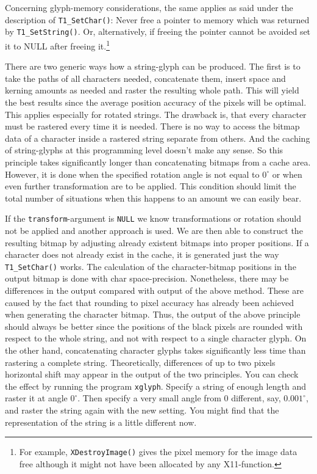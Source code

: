 Concerning glyph-memory considerations, the same applies as said under
the description of \verb+T1_SetChar()+: Never free a pointer to memory
which was returned by \verb+T1_SetString()+. Or, alternatively, if freeing
the pointer cannot be avoided set it to NULL after freeing it.\footnote{For
  example, {\tt XDestroyImage()} gives the pixel memory for the image
  data free although it might not have been allocated by any X11-function.} 

There are two generic ways how a string-glyph can be produced. The first is to
take the paths of all characters needed, concatenate them, insert space and
kerning amounts as needed and raster the resulting whole path. This will yield
the best results since the average position accuracy of the pixels will be
optimal. This applies especially for rotated strings. The drawback is, that
every character must be rastered every time it is needed. There is no way to
access the bitmap data of a character inside a rastered string separate from
others. And the caching of string-glyphs at this programming level doesn't
make any sense. So this principle takes significantly longer than
concatenating bitmaps from a cache area. However, it is done when the
specified rotation angle is not equal to $0^\circ$ or when even further
transformation are to be applied.  This condition should limit the total
number of situations when this happens to an amount we can easily bear.

If the \verb+transform+-argument is \verb+NULL+ we know transformations or
rotation should not be applied and another approach is used. We are then able
to construct the resulting bitmap by adjusting already existent bitmaps into
proper positions.  If a character does not already exist in the cache, it is
generated just the way \verb+T1_SetChar()+ works. The calculation of the
character-bitmap positions in the output bitmap is done with
char space-precision.  Nonetheless, there may be differences in the output
compared with output of the above method. These are caused by the fact that
rounding to pixel accuracy has already been achieved when generating the
character bitmap. Thus, the output of the above principle should always be
better since the positions of the black pixels are rounded with respect to the
whole string, and not with respect to a single character glyph. On the other
hand, concatenating character glyphs takes significantly less time than
rastering a complete string.  Theoretically, differences of up to two pixels
horizontal shift may appear in the output of the two principles. You can
check the effect by running the program \verb+xglyph+. Specify a string of
enough length and raster it at angle $0^\circ$. Then specify a very small
angle from 0 different, say, $0.001^\circ$, and raster the string again with
the new setting. You might find that the representation of the string is a
little different now.

